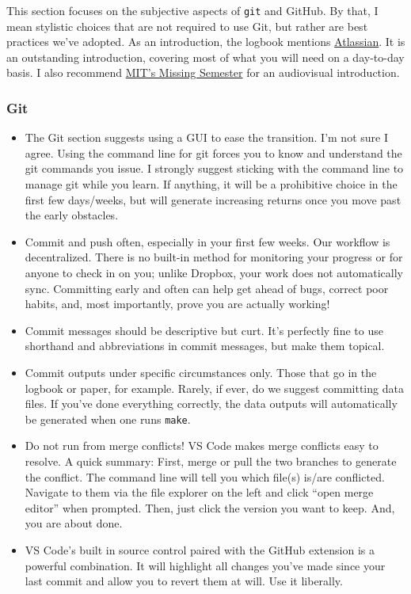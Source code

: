 This section focuses on the subjective aspects of \texttt{git} and GitHub. 
By that, I mean stylistic choices that are not required to use Git, 
but rather are best practices we've adopted. 
As an introduction, 
the logbook mentions \href{https://www.atlassian.com/git/tutorials}{Atlassian}. 
It is an outstanding introduction, 
covering most of what you will need on a day-to-day basis. 
I also recommend \href{https://missing.csail.mit.edu/2020/version-control/}{MIT's Missing Semester} 
for an audiovisual introduction.

\subsubsection{Git}
\begin{itemize}
    \item The Git section suggests using a GUI to ease the transition. 
          I'm not sure I agree. 
          Using the command line for git forces you to know and understand the git commands you issue. 
          I strongly suggest sticking with the command line to manage git while you learn. 
          If anything, it will be a prohibitive choice in the first few days/weeks, 
          but will generate increasing returns once you move past the early obstacles.
    \item Commit and push often, especially in your first few weeks.
Our workflow is decentralized.
There is no built-in method for monitoring your progress or for anyone to check in on you; 
unlike Dropbox, your work does not automatically sync. 
Committing early and often can help get ahead of bugs, correct poor habits, and, 
most importantly, prove you are actually working!
    \item Commit messages should be descriptive but curt. 
It's perfectly fine to use shorthand and abbreviations in commit messages, 
but make them topical. 
    \item Commit outputs under specific circumstances only. 
    Those that go in the logbook or paper, for example. 
    Rarely, if ever, do we suggest committing data files.
If you've done everything correctly, 
the data outputs will automatically be generated when one runs \texttt{make}.
    \item Do not run from merge conflicts! VS Code makes merge conflicts easy to resolve. 
    A quick summary: 
    First, merge or pull the two branches to generate the conflict. 
    The command line will tell you which file(s) is/are conflicted. 
    Navigate to them via the file explorer on the left and click ``open merge editor'' when prompted. Then, just click the version you want to keep.
    And, you are about done.
    \item VS Code's built in source control paired with the GitHub extension is a powerful combination.
    It will highlight all changes you've made since your last commit
     and allow you to revert them at will. 
    Use it liberally.
\end{itemize}

